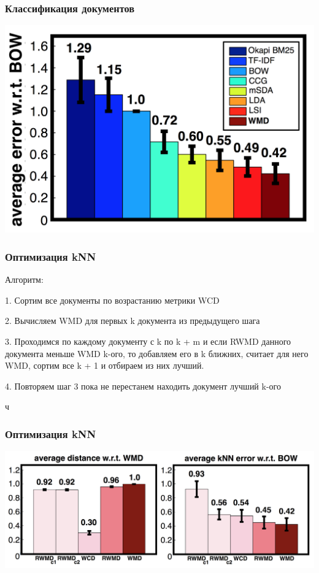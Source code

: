\documentclass{beamer}
\begin{document}
\begin{frame}
\frametitle{Классификация документов}

\includegraphics[width=1 \textwidth]{4.png}

\end{frame}


\begin{frame}
\frametitle{Оптимизация kNN}

Алгоритм:

1. Сортим все документы по возрастанию метрики WCD

2. Вычисляем WMD для первых k документа из предыдущего шага

3. Проходимся по каждому документу с k по k + m и если RWMD данного документа меньше WMD k-ого, то добавляем его в k ближних, считает для него WMD, сортим все k + 1 и отбираем из них лучший.

4. Повторяем шаг 3 пока не перестанем находить документ лучший k-ого

ч\end{frame}

\begin{frame}
\frametitle{Оптимизация kNN}

\includegraphics[width=1 \textwidth]{6.png}
\end{frame}
\end{document}
